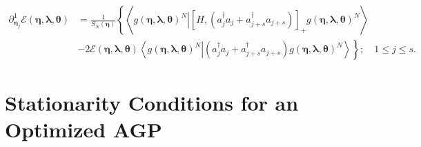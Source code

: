 \documentclass[aps,preprint]{revtex4}%
\begin{document}
\begin{align}
\partial_{\mathbf{\eta}_{j}}^{1}\mathcal{E}\left(  \mathbf{\eta}%
,\mathbf{\lambda},\mathbf{\theta}\right)   &  =\frac{1}{S_{N}\left(
\mathbf{\eta}\right)  }\left\{  \left\langle \left.  g\left(  \mathbf{\eta
},\mathbf{\lambda},\mathbf{\theta}\right)  ^{N}\right\vert \left[  H,\left(
a_{j}^{\dagger}a_{j}+a_{j+s}^{\dagger}a_{j+s}\right)  \right]  _{+}g\left(
\mathbf{\eta},\mathbf{\lambda},\mathbf{\theta}\right)  ^{N}\right\rangle
\right. \nonumber\\
&  -\left.  2\mathcal{E}\left(  \mathbf{\eta},\mathbf{\lambda},\mathbf{\theta
}\right)  \left\langle \left.  g\left(  \mathbf{\eta},\mathbf{\lambda
},\mathbf{\theta}\right)  ^{N}\right\vert \left(  a_{j}^{\dagger}a_{j}%
+a_{j+s}^{\dagger}a_{j+s}\right)  g\left(  \mathbf{\eta},\mathbf{\lambda
},\mathbf{\theta}\right)  ^{N}\right\rangle \right\}  ;\quad1\leq j\leq s.
\label{Deta}%
\end{align}


\section{Stationarity Conditions for an Optimized AGP\label{StatAGPCond}}
\end{document}
